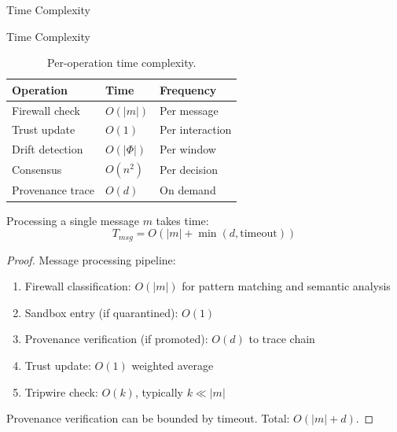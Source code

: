 \documentclass[
  ignorenonframetext,
]{beamer}
\begin{document}
\begin{frame}[allowframebreaks]{Time Complexity}
\protect{}\label{sec:time-complexity}
\end{frame}

\begin{frame}[allowframebreaks]{Time Complexity}
\begin{table}[htbp]
\centering
\caption{Per-operation time complexity.}
\label{tab:time-components}
\begin{tabular}{@{}lll@{}}
\toprule
Operation & Time & Frequency \\
\midrule
Firewall check & $O(|m|)$ & Per message \\
Trust update & $O(1)$ & Per interaction \\
Drift detection & $O(|\Phi|)$ & Per window \\
Consensus & $O(n^2)$ & Per decision \\
Provenance trace & $O(d)$ & On demand \\
\bottomrule
\end{tabular}
\end{table}

\begin{theorem}
\label{thm:message-time}
Processing a single message $m$ takes time:
\begin{equation}
\label{eq:message-processing}
T_{msg} = O(|m| + \min(d, \text{timeout}))
\end{equation}
\end{theorem}

\begin{proof}
Message processing pipeline:
\begin{enumerate}
\item Firewall classification: $O(|m|)$ for pattern matching and semantic analysis
\item Sandbox entry (if quarantined): $O(1)$
\item Provenance verification (if promoted): $O(d)$ to trace chain
\item Trust update: $O(1)$ weighted average
\item Tripwire check: $O(k)$, typically $k \ll |m|$
\end{enumerate}

Provenance verification can be bounded by timeout. Total: $O(|m| + d)$.
\end{proof}

\end{frame}
\end{document}
